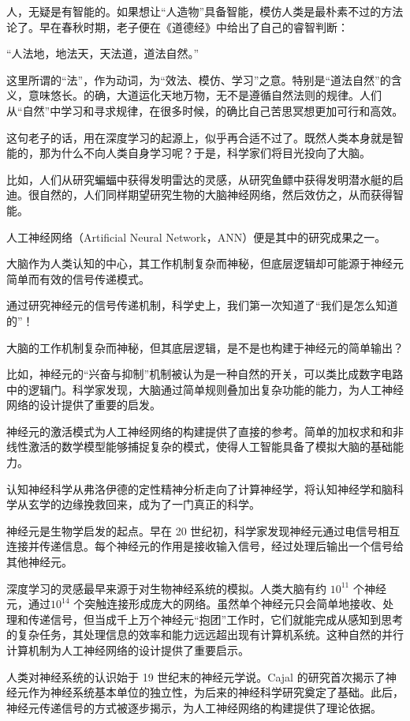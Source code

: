 人，无疑是有智能的。如果想让“人造物”具备智能，模仿人类是最朴素不过的方法论了。早在春秋时期，老子便在《道德经》中给出了自己的睿智判断：

“人法地，地法天，天法道，道法自然。”

这里所谓的“法”，作为动词，为“效法、模仿、学习”之意。特别是“道法自然”的含义，意味悠长。的确，大道运化天地万物，无不是遵循自然法则的规律。人们从“自然”中学习和寻求规律，在很多时候，的确比自己苦思冥想更加可行和高效。

这句老子的话，用在深度学习的起源上，似乎再合适不过了。既然人类本身就是智能的，那为什么不向人类自身学习呢？于是，科学家们将目光投向了大脑。

比如，人们从研究蝙蝠中获得发明雷达的灵感，从研究鱼鳔中获得发明潜水艇的启迪。很自然的，人们同样期望研究生物的大脑神经网络，然后效仿之，从而获得智能。

人工神经网络（Artificial Neural Network，ANN）便是其中的研究成果之一。

大脑作为人类认知的中心，其工作机制复杂而神秘，但底层逻辑却可能源于神经元简单而有效的信号传递模式。

通过研究神经元的信号传递机制，科学史上，我们第一次知道了“我们是怎么知道的”！

大脑的工作机制复杂而神秘，但其底层逻辑，是不是也构建于神经元的简单输出？

比如，神经元的“兴奋与抑制”机制被认为是一种自然的开关，可以类比成数字电路中的逻辑门。科学家发现，大脑通过简单规则叠加出复杂功能的能力，为人工神经网络的设计提供了重要的启发。

神经元的激活模式为人工神经网络的构建提供了直接的参考。简单的加权求和和非线性激活的数学模型能够捕捉复杂的模式，使得人工智能具备了模拟大脑的基础能力。

认知神经科学从弗洛伊德的定性精神分析走向了计算神经学，将认知神经学和脑科学从玄学的边缘挽救回来，成为了一门真正的科学。

神经元是生物学启发的起点。早在 20 世纪初，科学家发现神经元通过电信号相互连接并传递信息。每个神经元的作用是接收输入信号，经过处理后输出一个信号给其他神经元。

深度学习的灵感最早来源于对生物神经系统的模拟。人类大脑有约 $10^{11}$ 个神经元，通过$10^{14}$ 个突触连接形成庞大的网络。虽然单个神经元只会简单地接收、处理和传递信号，但当成千上万个神经元“抱团”工作时，它们就能完成从感知到思考的复杂任务，其处理信息的效率和能力远远超出现有计算机系统。这种自然的并行计算机制为人工神经网络的设计提供了重要启示。

人类对神经系统的认识始于 19 世纪末的神经元学说。Cajal 的研究首次揭示了神经元作为神经系统基本单位的独立性，为后来的神经科学研究奠定了基础。此后，神经元传递信号的方式被逐步揭示，为人工神经网络的构建提供了理论依据。

